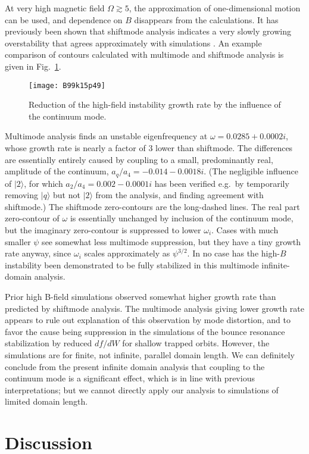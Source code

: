 \documentclass{jpp}
\def\ket#1{|#1\rangle}
\begin{document}
At very high magnetic field $\Omega\gtrsim5$, the approximation of
one-dimensional motion can be used, and dependence on $B$ disappears
from the calculations. It has previously been shown that shiftmode
analysis indicates a very slowly growing overstability that agrees
approximately with simulations
\citep{Hutchinson2019a}.  An example
comparison of contours calculated with multimode and shiftmode
analysis is given in Fig.\ \ref{hiB}.
\begin{figure}
  \center  \texttt{[image: B99k15p49]}
  \caption{Reduction of the high-field instability growth rate by the
    influence of the continuum mode.\label{hiB}}
\end{figure}
Multimode analysis finds an unstable eigenfrequency at
$\omega=0.0285+0.0002i$, whose growth rate is nearly a factor of 3
lower than shiftmode.  The differences are essentially entirely caused
by coupling to a small, predominantly real, amplitude of the
continuum, $a_q/a_4=-0.014-0.0018i$. (The negligible influence of
$\ket{2}$, for which $a_2/a_4=0.002-0.0001i$ has been verified e.g.\
by temporarily removing $\ket{q}$ but not $\ket{2}$ from the analysis,
and finding agreement with shiftmode.)  The shiftmode zero-contours
are the long-dashed lines. The real part zero-contour of $\omega$ is
essentially unchanged by inclusion of the continuum mode, but the
imaginary zero-contour is suppressed to lower $\omega_i$. Cases with
much smaller $\psi$ see somewhat less multimode suppression, but they
have a tiny growth rate anyway, since $\omega_i$ scales approximately
as $\psi^{3/2}$. In no case has the high-$B$ instability been
demonstrated to be fully stabilized in this multimode infinite-domain
analysis.

Prior high B-field simulations observed somewhat higher growth rate
than predicted by shiftmode analysis.  The multimode analysis giving
lower growth rate appears to rule out explanation of this observation
by mode distortion, and to favor the cause being suppression in the
simulations of the bounce resonance stabilization by reduced $df/dW$
for shallow trapped orbits. However, the simulations are for finite,
not infinite, parallel domain length.  We can definitely conclude from
the present infinite domain analysis that coupling to the continuum
mode is a significant effect, which is in line with previous
interpretations; but we cannot directly apply our analysis to
simulations of limited domain length.


\section{Discussion}
\end{document}
